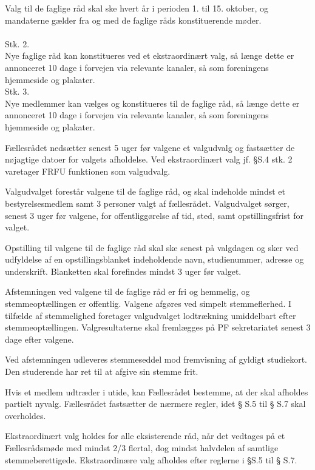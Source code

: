 \begin{list}
\item Valg til de faglige råd skal ske hvert år i perioden 1. til 15. oktober, og mandaterne gælder fra og med de faglige råds konstituerende møder.\\
\\
Stk. 2. \\
Nye faglige råd kan konstitueres ved et ekstraordinært valg, så længe dette er annonceret 10 dage i forvejen via relevante kanaler, så som foreningens hjemmeside og plakater.
\\Stk. 3. \\
Nye medlemmer kan vælges og konstitueres til de faglige råd, så længe dette er annonceret 10 dage i forvejen via relevante kanaler, så som foreningens hjemmeside og plakater.
\item Fællesrådet nedsætter senest 5 uger før valgene et valgudvalg og fastsætter de nøjagtige datoer for valgets afholdelse. Ved ekstraordinært valg jf. §S.4 stk. 2 varetager FRFU funktionen som valgudvalg.
\item Valgudvalget forestår valgene til de faglige råd, og skal indeholde mindst et bestyrelsesmedlem samt 3 personer valgt af fællesrådet. Valgudvalget sørger, senest 3 uger før valgene, for offentliggørelse af tid, sted, samt opstillingsfrist for valget.
\item Opstilling til valgene til de faglige råd skal ske senest på valgdagen og sker ved udfyldelse af en opstillingsblanket indeholdende navn, studienummer, adresse og underskrift. Blanketten skal forefindes mindst 3 uger før valget.
\item Afstemningen ved valgene til de faglige råd er fri og hemmelig, og stemmeoptællingen er offentlig. Valgene afgøres ved simpelt stemmeflerhed. I tilfælde af stemmelighed foretager valgudvalget lodtrækning umiddelbart efter stemmeoptællingen. Valgresultaterne skal fremlægges på PF sekretariatet senest 3 dage efter valgene.
\item Ved afstemningen udleveres stemmeseddel mod fremvisning af gyldigt studiekort. Den studerende har ret til at afgive sin stemme frit.
\item Hvis et medlem udtræder i utide, kan Fællesrådet bestemme, at der skal afholdes partielt nyvalg. Fællesrådet fastsætter de nærmere regler, idet § S.5 til § S.7 skal overholdes.
\item Ekstraordinært valg holdes for alle eksisterende råd, når det vedtages på et Fællesrådsmøde med mindst 2/3 flertal, dog mindst halvdelen af samtlige stemmeberettigede. Ekstraordinære valg afholdes efter reglerne i §S.5 til § S.7.


\end{list}
